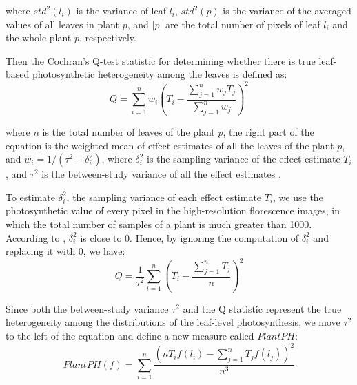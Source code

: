 \documentclass{bioinfo}
\begin{document}
\begin{methods}
\noindent where $std^2(l_i)$ is the variance of leaf $l_i$, $std^2(p)$ is  the variance of the averaged values of all leaves in plant $p$, and $|p|$ are the total number of pixels of leaf $l_i$ and the whole plant $p$, respectively.

%

Then the Cochran's Q-test statistic for determining whether there is true leaf-based photosynthetic heterogeneity among the leaves is defined as:
%
\begin{equation}\label{eq:Q}
Q=\sum_{i=1}^n w_i\left(T_i-\frac{\sum_{j=1}^n w_jT_j}{\sum_{j=1}^n w_j}\right)^2
\end{equation}

\noindent where $n$ is the total number of leaves of the plant $p$,  the right part of the equation is the weighted mean of effect estimates of all the leaves of the plant $p$, and $w_i=1/(\tau^2+\delta_i^2)$, where $\delta_i^2$ is the sampling variance of the effect estimate $T_i$, and $\tau^2$ is the between-study variance of all the effect estimates \citep{huedo2006assessing}.

To estimate $\delta_i^2$, the sampling variance of each effect estimate $T_i$, we use the photosynthetic value of every pixel in the high-resolution florescence images, in which the total number of samples of a plant is much greater than 1000. According to \citep{huedo2006assessing}, $\delta_i^2$ is close to 0. Hence, by ignoring the computation of  $\delta_i^2$ and replacing it with 0, we have:
%
\begin{equation}\label{eq:Q2}
Q=\frac{1}{\tau^2}\sum_{i=1}^n\left(T_i-\frac{\sum_{j=1}^n T_j}{n}\right)^2
\end{equation}

Since both the between-study variance $\tau^2$ and the Q statistic represent the true heterogeneity among the distributions of the leaf-level photosynthesis, we move $\tau^2$ to the left of the equation and define a new measure called $PlantPH$:
%
\begin{equation}\label{eq:Q3}
PlantPH(f)=\sum_{i=1}^n\frac{\left(nT_if(l_i)-\sum_{j=1}^n T_jf(l_j)\right)^2}{n^3}
\end{equation}


\end{methods}
\end{document}
